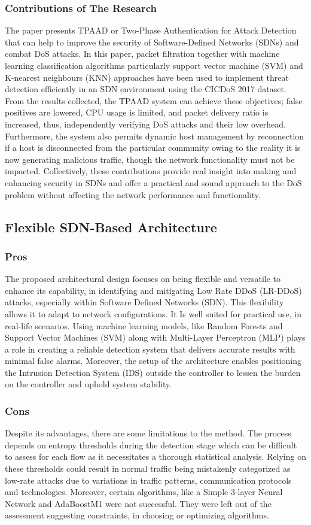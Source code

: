 \documentclass[a4paper, 12pt]{article}
\begin{document}
\subsubsection{Contributions of The Research}
The paper presents TPAAD or Two-Phase Authentication for Attack Detection that can help to improve the security of Software-Defined Networks (SDNs) and combat DoS attacks. In this paper, packet filtration together with machine learning classification algorithms particularly support vector machine (SVM) and K-nearest neighbours (KNN) approaches have been used to implement threat detection efficiently in an SDN environment using the CICDoS 2017 dataset. From the results collected, the TPAAD system can achieve these objectives; false positives are lowered, CPU usage is limited, and packet delivery ratio is increased, thus, independently verifying DoS attacks and their low overhead. Furthermore, the system also permits dynamic host management by reconnection if a host is disconnected from the particular community owing to the reality it is now generating malicious traffic, though the network functionality must not be impacted. Collectively, these contributions provide real insight into making and enhancing security in SDNs and offer a practical and sound approach to the DoS problem without affecting the network performance and functionality. 

\subsection{Flexible SDN-Based Architecture}
\subsubsection{Pros}
The proposed architectural design focuses on being flexible and versatile to enhance its capability, in identifying and mitigating Low Rate DDoS (LR-DDoS) attacks, especially within Software Defined Networks (SDN). This flexibility allows it to adapt to network configurations. It Is well suited for practical use, in real-life scenarios. Using machine learning models, like Random Forests and Support Vector Machines (SVM) along with Multi-Layer Perceptron (MLP) plays a role in creating a reliable detection system that delivers accurate results with minimal false alarms. Moreover, the setup of the architecture enables positioning the Intrusion Detection System (IDS) outside the controller to lessen the burden on the controller and uphold system stability. 
\subsubsection{Cons}
Despite its advantages, there are some limitations to the method. The process depends on entropy thresholds during the detection stage which can be difficult to assess for each flow as it necessitates a thorough statistical analysis. Relying on these thresholds could result in normal traffic being mistakenly categorized as low-rate attacks due to variations in traffic patterns, communication protocols and technologies. Moreover, certain algorithms, like a Simple 3-layer Neural Network and AdaBoostM1 were not successful. They were left out of the assessment suggesting constraints, in choosing or optimizing algorithms.
\end{document}
